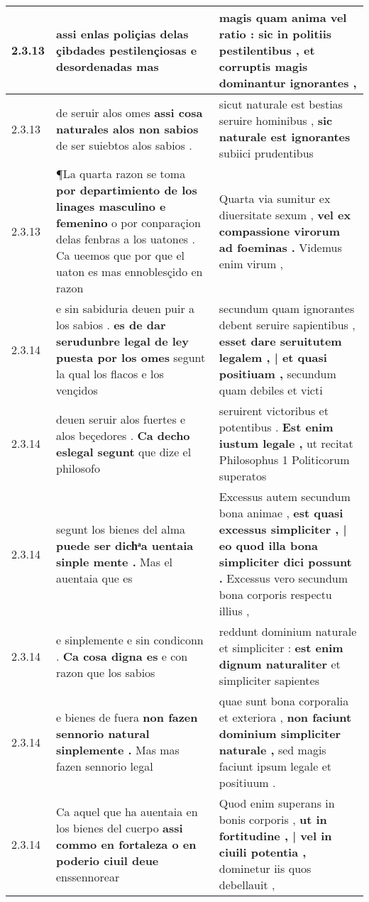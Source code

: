\begin{tabular}{|p{1cm}|p{6.5cm}|p{6.5cm}|}
2.3.13 & assi enlas poliçias \textbf{ delas çibdades pestilençiosas e desordenadas } mas & magis quam anima vel ratio : \textbf{ sic in politiis pestilentibus , } et corruptis magis dominantur ignorantes , \\\hline
2.3.13 & de seruir alos omes \textbf{ assi cosa naturales alos non sabios } de ser suiebtos alos sabios . & sicut naturale est bestias seruire hominibus , \textbf{ sic naturale est ignorantes } subiici prudentibus \\\hline
2.3.13 & ¶La quarta razon se toma \textbf{ por departimiento de los linages masculino e femenino } o por conparaçion delas fenbras a los uatones . Ca ueemos que por que el uaton es mas ennoblesçido en razon & Quarta via sumitur ex diuersitate sexum , \textbf{ vel ex compassione virorum ad foeminas . } Videmus enim virum , \\\hline
2.3.14 & e sin sabiduria deuen puir a los sabios . \textbf{ es de dar serudunbre legal de ley puesta por los omes } segunt la qual los flacos e los vençidos & secundum quam ignorantes debent seruire sapientibus , \textbf{ esset dare seruitutem legalem , | et quasi positiuam , } secundum quam debiles et victi \\\hline
2.3.14 & deuen seruir alos fuertes e alos beçedores . \textbf{ Ca decho eslegal segunt } que dize el philosofo & seruirent victoribus et potentibus . \textbf{ Est enim iustum legale , } ut recitat Philosophus 1 Politicorum superatos \\\hline
2.3.14 & segunt los bienes del alma \textbf{ puede ser dichͣa uentaia sinple mente . } Mas el auentaia que es & Excessus autem secundum bona animae , \textbf{ est quasi excessus simpliciter , | eo quod illa bona simpliciter dici possunt . } Excessus vero secundum bona corporis respectu illius , \\\hline
2.3.14 & e sinplemente e sin condiconn . \textbf{ Ca cosa digna es } e con razon que los sabios & reddunt dominium naturale et simpliciter : \textbf{ est enim dignum naturaliter } et simpliciter sapientes \\\hline
2.3.14 & e bienes de fuera \textbf{ non fazen sennorio natural sinplemente . } Mas mas fazen sennorio legal & quae sunt bona corporalia et exteriora , \textbf{ non faciunt dominium simpliciter naturale , } sed magis faciunt ipsum legale et positiuum . \\\hline
2.3.14 & Ca aquel que ha auentaia en los bienes del cuerpo \textbf{ assi commo en fortaleza o en poderio ciuil deue } enssennorear & Quod enim superans in bonis corporis , \textbf{ ut in fortitudine , | vel in ciuili potentia , } dominetur iis quos debellauit , \\\hline

\end{tabular}
